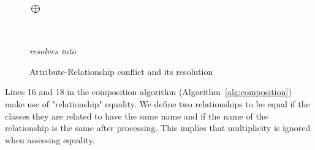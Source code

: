 \documentclass[sigconf]{acmart}
\begin{document}
\begin{figure}[h]
    \centering
    \quad $\bigoplus$ \quad
    \\ \quad \\
    \textit{resolves into}\\
    \caption{Attribute-Relationship conflict and its resolution}
    \label{fig:attribute-rel-conflict}
\end{figure}

Lines 16 and 18 in the composition algorithm (Algorithm~\ref{alg:composition}) make use of "relationship" equality. We define two relationships to be equal if the classes they are related to have the same name and if the name of the relationship is the same after processing. This implies that multiplicity is ignored when assessing equality.
\end{document}
